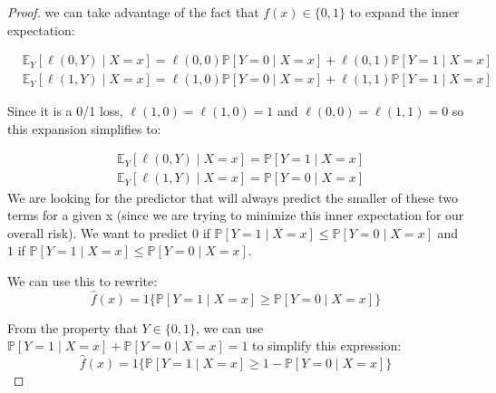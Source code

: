 \begin{proof}



 we can take advantage of the fact that $f(x) \in \{0, 1\}$ to expand the inner expectation:


$$\begin{aligned}
&\mathbb{E}_Y[\ell(0, Y) \mid X=x]=\ell(0,0) \mathbb{P}[Y=0 \mid X=x]+\ell(0,1) \mathbb{P}[Y=1 \mid X=x] \\
&\mathbb{E}_Y[\ell(1, Y) \mid X=x]=\ell(1,0) \mathbb{P}[Y=0 \mid X=x]+\ell(1,1) \mathbb{P}[Y=1 \mid X=x]
\end{aligned}
$$

\noindent
Since it is a 0/1 loss, $\ell(1,0) = \ell(1,0) = 1$ and $\ell(0,0) = \ell(1,1) = 0$ so this expansion simplifies to:

$$\begin{aligned}
&\mathbb{E}_Y[\ell(0, Y) \mid X=x]= \mathbb{P}[Y=1 \mid X=x] \\
&\mathbb{E}_Y[\ell(1, Y) \mid X=x]=\mathbb{P}[Y=0 \mid X=x]
\end{aligned}
$$
We are looking for the predictor that will always predict the smaller of these two terms for a given x (since we are trying to minimize this inner expectation for our overall risk). We want to predict $0$ if $\mathbb{P}[Y=1 \mid X=x] \leq \mathbb{P}[Y=0 \mid X=x]$ and $1$ if $\mathbb{P}[Y=1 \mid X=x] \leq \mathbb{P}[Y=0 \mid X=x]$.

\noindent
We can use this to rewrite:
$$\hat{f}(x) = 1\{\mathbb{P}[Y=1 \mid X=x] \geq \mathbb{P}[Y=0 \mid X=x]\}$$

\noindent
From the property that $Y \in \{0, 1\}$, we can use $\mathbb{P}[Y=1 \mid X=x] + \mathbb{P}[Y=0 \mid X=x] = 1$ to simplify this expression:
$$\hat{f}(x) = 1\{\mathbb{P}[Y=1 \mid X=x] \geq 1 - \mathbb{P}[Y=0 \mid X=x]\}$$ 


\end{proof}

